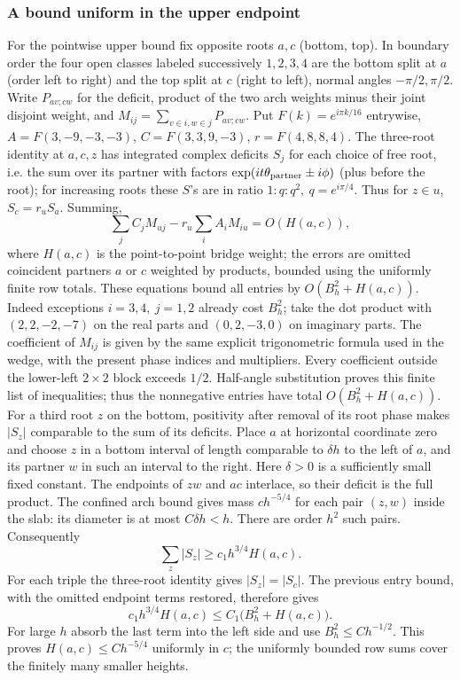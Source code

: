 \subsubsection{A bound uniform in the upper endpoint}
For the pointwise upper bound fix opposite roots \(a,c\) (bottom, top). In boundary order the four open classes labeled successively \(1,2,3,4\) are the bottom split at \(a\) (order left to right) and the top split at \(c\) (right to left), normal angles \(-\pi/2,\pi/2\). Write \(P_{av;cw}\) for the deficit, product of the two arch weights minus their joint disjoint weight, and \(M_{ij}=\sum_{v\in i,w\in j}P_{av;cw}\). Put \(F(k)=e^{i\pi k/16}\) entrywise, \(A=F(3,-9,-3,-3)\), \(C=F(3,3,9,-3)\), \(r=F(4,8,8,4)\). The three-root identity at \(a,c,z\) has integrated complex deficits \(S_j\) for each choice of free root, i.e. the sum over its partner with factors \(\exp(it\theta_{\rm partner}\pm i\phi)\) (plus before the root); for increasing roots these \(S\)'s are in ratio \(1:q:q^2,\ q=e^{i\pi/4}\). Thus for \(z\in u\), \(S_c=r_u S_a\). Summing,
\[
 \sum_j C_j M_{uj}-r_u\sum_i A_i M_{iu}=O(H(a,c)),
\]
where \(H(a,c)\) is the point-to-point bridge weight; the errors are omitted coincident partners \(a\) or \(c\) weighted by products, bounded using the uniformly finite row totals. These equations bound all entries by \(O(B_h^2+H(a,c))\). Indeed exceptions \(i=3,4,\ j=1,2\) already cost \(B_h^2\); take the dot product with \((2,2,-2,-7)\) on the real parts and \((0,2,-3,0)\) on imaginary parts. The coefficient of $M_{ij}$ is given by the same explicit trigonometric
formula used in the wedge, with the present phase indices and
multipliers. Every coefficient outside the lower-left $2\times2$ block
exceeds $1/2$. Half-angle substitution proves this finite list of
inequalities; thus the nonnegative entries have total
$O(B_h^2+H(a,c))$. For a third root $z$ on the bottom, positivity after removal of its
root phase makes $|S_z|$ comparable to the sum of its deficits. Place
$a$ at horizontal coordinate zero and choose $z$ in a bottom interval of
length comparable to $\delta h$ to the left of $a$, and its partner $w$
in such an interval to the right. Here $\delta>0$ is a sufficiently small
fixed constant. The endpoints of $zw$ and $ac$ interlace, so their
deficit is the full product. The confined arch bound gives mass
$c h^{-5/4}$ for each pair $(z,w)$ inside the slab: its diameter is at
most $C\delta h<h$. There are order $h^2$ such pairs. Consequently
\[
 \sum_z |S_z|\ge c_1 h^{3/4}H(a,c).
\]
For each triple the three-root identity gives $|S_z|=|S_c|$.
The previous entry bound, with the omitted endpoint terms restored,
therefore gives
\[
 c_1h^{3/4}H(a,c)\le C_1\bigl(B_h^2+H(a,c)\bigr).
\]
For large $h$ absorb the last term into the left side and use
$B_h^2\le Ch^{-1/2}$. This proves $H(a,c)\le Ch^{-5/4}$ uniformly in
$c$; the uniformly bounded row sums cover the finitely many smaller
heights.

